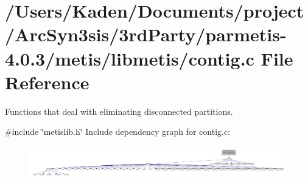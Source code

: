 \hypertarget{a00188}{}\section{/\+Users/\+Kaden/\+Documents/project/\+Arc\+Syn3sis/3rd\+Party/parmetis-\/4.0.3/metis/libmetis/contig.c File Reference}
\label{a00188}


Functions that deal with eliminating disconnected partitions.  


{\ttfamily \#include \char`\"{}metislib.\+h\char`\"{}}\newline
Include dependency graph for contig.\+c\+:\nopagebreak
\begin{figure}[H]
\begin{center}
\leavevmode
\includegraphics[width=350pt]{a00189}
\end{center}
\end{figure}
